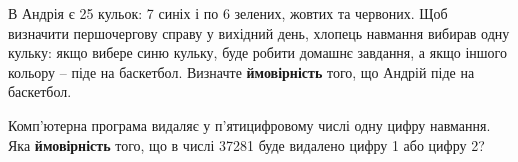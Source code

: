 \documentclass[12pt]{article}
\begin{document}
\begin{samepage}
\noindent\zadnum В Андрія є 25 кульок: 7 синіх і по 6 зелених, жовтих та червоних. Щоб визначити першочергову справу у вихідний день, хлопець навмання вибирав одну кульку: якщо вибере синю кульку, буде робити домашнє завдання, а якщо іншого кольору – піде на баскетбол. Визначте \textbf{ймовірність} того, що Андрій піде на баскетбол. 

\nmtnobreak
\nopagebreak\nbvspace{0.3cm}
\par{}
\end{samepage}

\begin{samepage}
\noindent\zadnum Комп’ютерна програма видаляє у п’ятицифровому числі одну цифру навмання. Яка \textbf{ймовірність} того, що в числі 37281 буде видалено цифру 1 або цифру 2? 

\nmtnobreak
\nopagebreak\nbvspace{0.3cm}
\par{}
\end{samepage}
\end{document}
